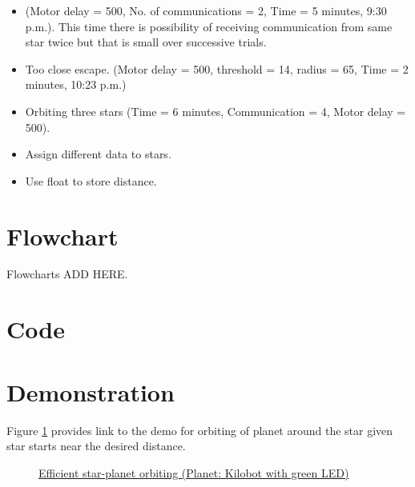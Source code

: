 \documentclass{report}[12pt]
\begin{document}
\begin{itemize}
    \item (Motor delay = 500, No. of communications = 2, Time = 5 minutes, 9:30 p.m.). This time there is possibility of receiving communication from same star twice but that is small over successive trials.
    \item Too close escape. (Motor delay = 500, threshold = 14, radius = 65, Time = 2 minutes, 10:23 p.m.)
    \item Orbiting three stars (Time = 6 minutes, Communication = 4, Motor delay = 500).
    \item Assign different data to stars.
    \item Use float to store distance.
\end{itemize}
\section{Flowchart}
Flowcharts ADD HERE.

\section{Code}



\section{Demonstration}
Figure \ref{fig:efficient_star_planet_orbiting} provides link to the demo for orbiting of planet around the star given star starts near the desired distance.
\begin{figure}[H]
    \centering
    \caption{\href{https://youtu.be/LRgOzhAJI1k}{Efficient star-planet orbiting (Planet: Kilobot with green LED)}}
    \label{fig:efficient_star_planet_orbiting}
\end{figure}
\end{document}
